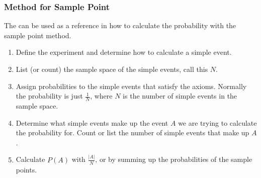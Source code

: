 \documentclass{article}
\theoremstyle{plain}
\theoremstyle{definition}
\theoremstyle{remark}
\begin{document}
\subsubsection{Method for Sample Point}
The can be used as a reference in how to calculate the probability with the sample point method.
\begin{enumerate}
  \item Define the experiment and determine how to calculate a simple event.
  \item List (or count) the sample space of the simple events, call this $N$.
  \item Assign probabilities to the simple events that satisfy the axioms. Normally the probability is just $\frac{1}{N}$, where $N$ is the number of simple events in the sample space.
  \item Determine what simple events make up the event $A$ we are trying to calculate the probability for. Count or list the number of simple events that make up $A$.
  \item Calculate $P(A)$ with $\frac{|A|}{N}$, or by summing up the probabilities of the sample points.
\end{enumerate}
\end{document}
